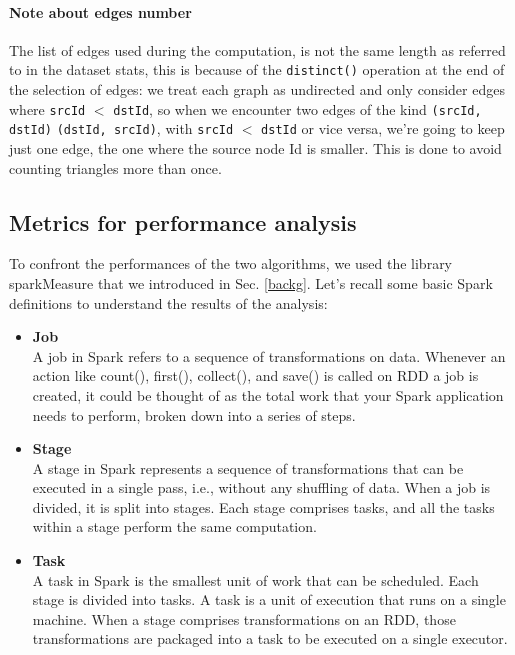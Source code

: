 \documentclass[a4paper,11pt, twoside]{article}
\begin{document}
        \paragraph{Note about edges number} The list of edges used during the computation, is not the same length as referred to in the dataset stats, this is because of the \texttt{distinct()} operation at the end of the selection of edges: we treat each graph as undirected and only consider edges where \texttt{srcId} $<$ \texttt{dstId}, so when we encounter two edges of the kind \texttt{(srcId, dstId)} \texttt{(dstId, srcId)}, with \texttt{srcId} $<$ \texttt{dstId} or vice versa, we're going to keep just one edge, the one where the source node Id is smaller. This is done to avoid counting triangles more than once.
    
        \subsection{Metrics for performance analysis}
        To confront the performances of the two algorithms, we used the library sparkMeasure that we introduced in Sec. \ref{backg}. 
        Let's recall some basic Spark definitions to understand the results of the analysis:
        \begin{itemize}
            \item \textbf{Job}\\  A job in Spark refers to a sequence of transformations on data. Whenever an action like count(), first(), collect(), and save() is called on RDD a job is created, it could be thought of as the total work that your Spark application needs to perform, broken down into a series of steps.
    
            \item \textbf{Stage}\\ A stage in Spark represents a sequence of transformations that can be executed in a single pass, i.e., without any shuffling of data. When a job is divided, it is split into stages. Each stage comprises tasks, and all the tasks within a stage perform the same computation.
    
            \item \textbf{Task}\\A task in Spark is the smallest unit of work that can be scheduled. Each stage is divided into tasks. A task is a unit of execution that runs on a single machine. When a stage comprises transformations on an RDD, those transformations are packaged into a task to be executed on a single executor.
        \end{itemize}
    
\end{document}
